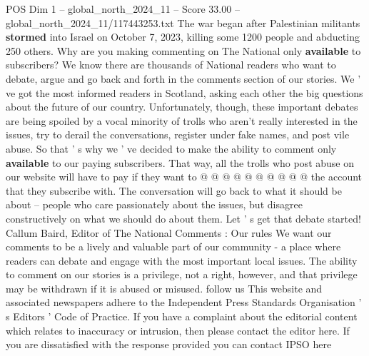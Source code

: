 \begin{textsample}{POS Dim 1 – global\_north\_2024\_11 – Score 33.00 – global\_north\_2024\_11/117443253.txt}
The war began after Palestinian militants \textbf{stormed} into Israel on October 7, 2023, killing some 1200 people and abducting 250 others.
Why are you making commenting on The National only \textbf{available} to subscribers?
We know there are thousands of National readers who want to debate, argue and go back and forth in the comments section of our stories.
We ' ve got the most informed readers in Scotland, asking each other the big questions about the future of our country.
Unfortunately, though, these important debates are being spoiled by a vocal minority of trolls who aren't really interested in the issues, try to derail the conversations, register under fake names, and post vile abuse.
So that ' s why we ' ve decided to make the ability to comment only \textbf{available} to our paying subscribers.
That way, all the trolls who post abuse on our website will have to pay if they want to @ @ @ @ @ @ @ @ @ @ the account that they subscribe with.
The conversation will go back to what it should be about -- people who care passionately about the issues, but disagree constructively on what we should do about them.
Let ' s get that debate started!
Callum Baird, Editor of The National Comments : Our rules We want our comments to be a lively and valuable part of our community - a place where readers can debate and engage with the most important local issues.
The ability to comment on our stories is a privilege, not a right, however, and that privilege may be withdrawn if it is abused or misused. follow us This website and associated newspapers adhere to the Independent Press Standards Organisation ' s Editors ' Code of Practice.
If you have a complaint about the editorial content which relates to inaccuracy or intrusion, then please contact the editor here.
If you are dissatisfied with the response provided you can contact IPSO here

\end{textsample}
